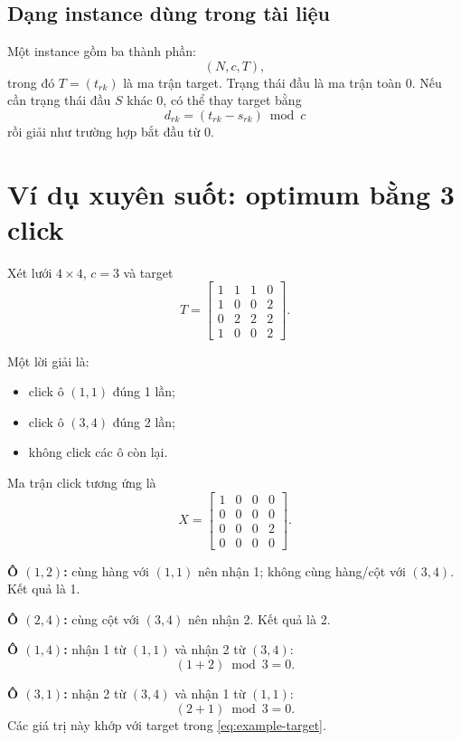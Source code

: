 \documentclass[11pt,a4paper]{article}
\begin{document}
\subsection{Dạng instance dùng trong tài liệu}

Một instance gồm ba thành phần:
\[
  (N,c,T),
\]
trong đó $T=(t_{rk})$ là ma trận target. Trạng thái đầu là ma trận toàn 0.
Nếu cần trạng thái đầu $S$ khác 0, có thể thay target bằng
\[
  d_{rk}=(t_{rk}-s_{rk})\bmod c
\]
rồi giải như trường hợp bắt đầu từ 0.

\section{Ví dụ xuyên suốt: optimum bằng 3 click}\label{sec:example}

Xét lưới $4\times4$, $c=3$ và target
\begin{equation}\label{eq:example-target}
T=
\begin{bmatrix}
1&1&1&0\\
1&0&0&2\\
0&2&2&2\\
1&0&0&2
\end{bmatrix}.
\end{equation}

Một lời giải là:
\begin{itemize}
  \item click ô $(1,1)$ đúng 1 lần;
  \item click ô $(3,4)$ đúng 2 lần;
  \item không click các ô còn lại.
\end{itemize}

Ma trận click tương ứng là
\begin{equation}\label{eq:example-x}
X=
\begin{bmatrix}
1&0&0&0\\
0&0&0&0\\
0&0&0&2\\
0&0&0&0
\end{bmatrix}.
\end{equation}

\begin{examplebox}
\textbf{Ô $(1,2)$:} cùng hàng với $(1,1)$ nên nhận 1; không cùng hàng/cột
với $(3,4)$. Kết quả là 1.

\textbf{Ô $(2,4)$:} cùng cột với $(3,4)$ nên nhận 2. Kết quả là 2.

\textbf{Ô $(1,4)$:} nhận 1 từ $(1,1)$ và nhận 2 từ $(3,4)$:
\[
  (1+2)\bmod3=0.
\]

\textbf{Ô $(3,1)$:} nhận 2 từ $(3,4)$ và nhận 1 từ $(1,1)$:
\[
  (2+1)\bmod3=0.
\]
Các giá trị này khớp với target trong \cref{eq:example-target}.
\end{examplebox}
\end{document}
